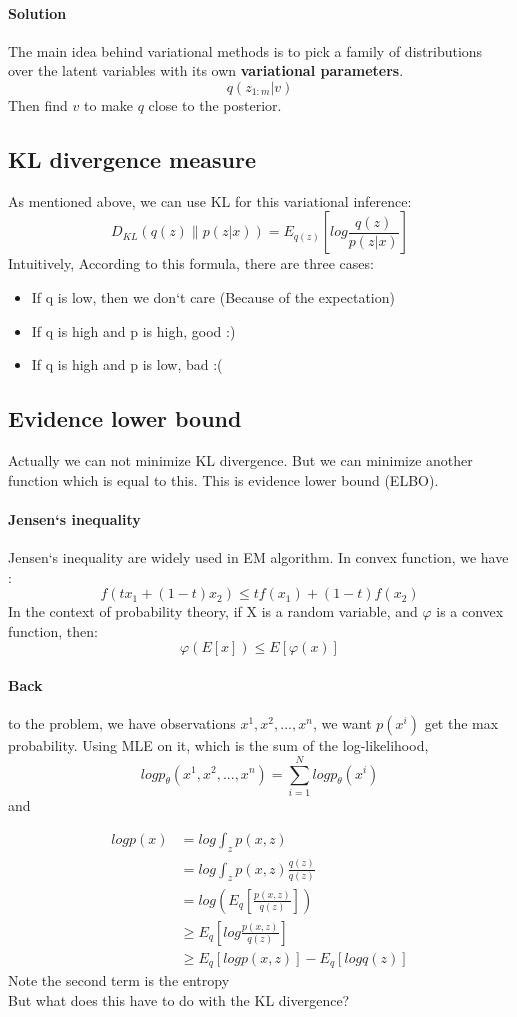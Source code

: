 \documentclass{article}
\begin{document}
\paragraph{Solution} The main idea behind variational methods is to pick a family of distributions over the latent variables with its own \textbf{variational parameters}.
$$q(z_{1:m}|v)$$
Then find $v$ to make $q$ close to the posterior.
\subsection{KL divergence measure}
As mentioned above, we can use KL for this variational inference:
$$D_{KL}(q(z) \parallel p(z|x))=E_{q(z)} \left[ log \frac{q(z)}{p(z|x)} \right]$$
Intuitively, According to this formula, there are three cases:
\begin{itemize}
\item If q is low, then we don`t care (Because of the expectation)
\item If q is high and p is high, good :)
\item If q is high and p is low, bad :(
\end{itemize}
\subsection{Evidence lower bound}
Actually we can not minimize KL divergence. But we can minimize another function which is equal to this. This is evidence lower bound (ELBO).
\paragraph{Jensen`s inequality}
Jensen`s inequality are widely used in EM algorithm. In convex function, we have :
$$f(tx_{1}+(1-t)x_{2})\leq tf(x_{1})+(1-t)f(x_{2}) $$ 
In the context of probability theory, if X is a random variable, and $\varphi$ is a convex function, then:
$$\varphi(E[x]) \leq E[\varphi(x)]$$
\paragraph{Back} to the problem, we have observations $x^{1},x^{2},...,x^{n}$, we want $p(x^{i})$ get the max probability. Using MLE on it, which is the sum of the log-likelihood,
$$logp_{\theta}(x^{1},x^{2},...,x^{n})=\sum_{i=1}^{N}logp_{\theta} (x^{i})$$
and

\begin{align*}
logp(x) & =log \int_{z}p(x,z) \\
 &= log \int_{z}p(x,z)\frac{q(z)}{q(z)} \\
 &= log \left( E_{q} \left[ \frac{p(x,z)}{q(z)} \right] \right) \\
 &\geq E_{q} \left[ log \frac{p(x,z)}{q(z)} \right] \\
 &\geq E_{q}[logp(x,z)]-E_{q}[logq(z)]
\end{align*}
Note the second term is the entropy\\
But what does this have to do with the KL divergence? 
\end{document}
